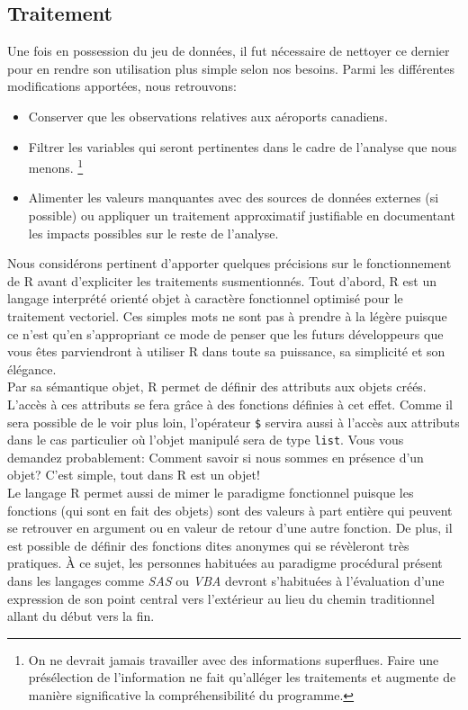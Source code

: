 \subsection{Traitement}
\label{subsec:Traitement}

Une fois en possession du jeu de données, il fut nécessaire de nettoyer ce dernier pour en rendre son utilisation plus simple selon nos besoins. Parmi les différentes modifications apportées, nous retrouvons: \\
\begin{itemize}
	\item Conserver que les observations relatives aux aéroports canadiens.
	\item Filtrer les variables qui seront pertinentes dans le cadre de l'analyse que nous menons. 
		\footnote{On ne devrait jamais travailler avec des informations superflues. Faire une présélection de l'information ne fait qu'alléger les traitements et augmente de manière significative la compréhensibilité du programme.}
	\item Alimenter les valeurs manquantes avec des sources de données externes (si possible) ou appliquer un traitement approximatif justifiable en documentant les impacts possibles sur le reste de l'analyse.
\end{itemize}
\vspace{\baselineskip}

Nous considérons pertinent d'apporter quelques précisions sur le fonctionnement de R avant d'expliciter les traitements susmentionnés. Tout d'abord, R est un langage interprété orienté objet à caractère fonctionnel optimisé pour le traitement vectoriel. Ces simples mots ne sont pas à prendre à la légère puisque ce n'est qu'en s'appropriant ce mode de penser que les futurs développeurs que vous êtes parviendront à utiliser R dans toute sa puissance, sa simplicité et son élégance. \\

Par sa sémantique objet, R permet de définir des attributs aux objets créés. L'accès à ces attributs se fera grâce à des fonctions définies à cet effet. Comme il sera possible de le voir plus loin, l'opérateur \texttt{\$} servira aussi à l'accès aux attributs dans le cas particulier où l'objet manipulé sera de type \texttt{list}.
Vous vous demandez probablement: Comment savoir si nous sommes en présence d'un objet? C'est simple, tout dans R est un objet! \\

Le langage R permet aussi de mimer le paradigme fonctionnel puisque les fonctions (qui sont en fait des objets) sont des valeurs à part entière qui peuvent se retrouver en argument ou en valeur de retour d'une autre fonction. De plus, il est possible de définir des fonctions dites anonymes qui se révèleront très pratiques. À ce sujet, les personnes habituées au paradigme procédural présent dans les langages comme \emph{SAS} ou \emph{VBA} devront s'habituées à l'évaluation d'une expression de son point central vers l'extérieur au lieu du chemin traditionnel allant du début vers la fin. \\

